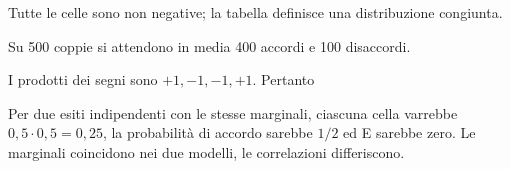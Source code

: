 Tutte le celle sono non negative; la tabella definisce una distribuzione congiunta.




Su 500 coppie si attendono in media 400 accordi e 100 disaccordi.


I prodotti dei segni sono \(+1,-1,-1,+1\). Pertanto


Per due esiti indipendenti con le stesse marginali, ciascuna cella varrebbe \(0{,}5\cdot0{,}5=0{,}25\), la probabilità di accordo sarebbe \(1/2\) ed E sarebbe zero. Le marginali coincidono nei due modelli, le correlazioni differiscono.

